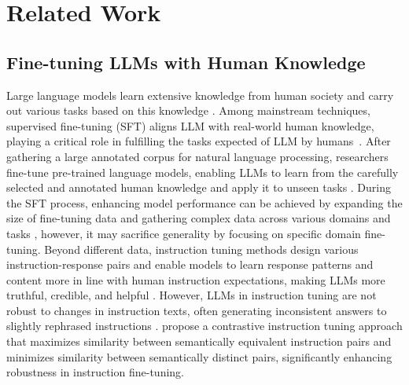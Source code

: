 \section{Related Work}
\subsection{Fine-tuning LLMs with Human Knowledge}
Large language models learn extensive knowledge from human society and carry out various tasks based on this knowledge \citep{DBLP:conf/iclr/BurnsYKS23,DBLP:conf/nips/Ouyang0JAWMZASR22, DBLP:journals/corr/abs-2307-09007, DBLP:journals/corr/abs-2308-10855}. Among mainstream techniques, supervised fine-tuning (SFT) aligns LLM with real-world human knowledge, playing a critical role in fulfilling the tasks expected of LLM by humans~\cite{DBLP:conf/acl/LiXC0LMJLZZS24, DBLP:conf/aaai/YuJLHWLCLLTZZXH24, DBLP:conf/emnlp/DuW0D0LZVZSZGL024, DBLP:journals/eswa/LiMCHHLZS25}. After gathering a large annotated corpus for natural language processing, researchers fine-tune pre-trained language models, enabling LLMs to learn from the carefully selected and annotated human knowledge and apply it to unseen tasks \citep{DBLP:conf/iclr/WeiBZGYLDDL22,DBLP:conf/iclr/SanhWRBSACSRDBX22}. During the SFT process, enhancing model performance can be achieved by expanding the size of fine-tuning data \citep{DBLP:journals/corr/abs-2210-11416} and gathering complex data across various domains and tasks \citep{DBLP:journals/corr/abs-2305-14705,DBLP:conf/icml/LongpreHVWCTZLZ23}, however, it may sacrifice generality by focusing on specific domain fine-tuning. Beyond different data, instruction tuning methods design various instruction-response pairs and enable models to learn response patterns and content more in line with human instruction expectations, making LLMs more truthful, credible, and helpful \citep{DBLP:conf/iclr/0131Z00H24,DBLP:conf/iclr/MuennighoffLZZH24}. However, LLMs in instruction tuning are not robust to changes in instruction texts, often generating inconsistent answers to slightly rephrased instructions \citep{DBLP:conf/iclr/LiuLLWYW24}. \citet{DBLP:conf/acl/YanWHZYG0C24} propose a contrastive instruction tuning approach that maximizes similarity between semantically equivalent instruction pairs and minimizes similarity between semantically distinct pairs, significantly enhancing robustness in instruction fine-tuning.

